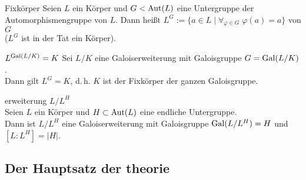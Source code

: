 \linie

\begin{Def}{Fixkörper}
    Seien $L$ ein Körper und $G < \operatorname{Aut}(L)$ eine Untergruppe der
    Automorphismengruppe von $L$.
    Dann heißt $L^G := \{a \in L \;|\;
    \forall_{\varphi \in G}\; \varphi(a) = a\}$
     von $G$\\
    ($L^G$ ist in der Tat ein Körper).
\end{Def}

\begin{Prop}{$L^{\operatorname{Gal}(L/K)} = K$}
    Sei $L/K$ eine Galoiserweiterung mit Galoisgruppe $G = \operatorname{Gal}(L/K)$.\\
    Dann gilt $L^G = K$, d.\,h. $K$ ist der Fixkörper der ganzen Galoisgruppe.
\end{Prop}

\linie

\begin{Prop}{erweiterung $L/L^H$}\\
    Seien $L$ ein Körper und $H \subset \operatorname{Aut}(L)$ eine endliche Untergruppe.\\
    Dann ist $L/L^H$ eine Galoiserweiterung mit Galoisgruppe $\operatorname{Gal}(L/L^H) = H$
    und $[L : L^H] = |H|$.
\end{Prop}

\pagebreak

\subsection{%
    Der Hauptsatz der theorie%
}

